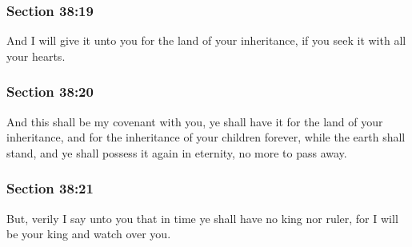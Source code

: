 	\subsubsection{Section 38:19} %
		\label{DC38-19}

		And I will give it unto you for the land of your inheritance, if you seek it with all your hearts.


	\subsubsection{Section 38:20} %
		\label{DC38-20}

		And this shall be my covenant with you, ye shall have it for the land of your inheritance, and for the inheritance of your children forever, while the earth shall stand, and ye shall possess it again in eternity, no more to pass away.


	\subsubsection{Section 38:21} %
		\label{DC38-21}

		But, verily I say unto you that in time ye shall have no king nor ruler, for I will be your king and watch over you.


